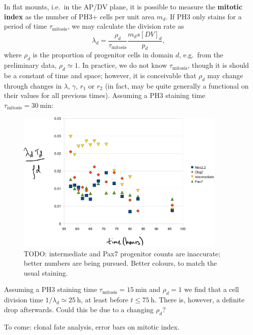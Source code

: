 \documentclass[10pt,english]{article}
\begin{document}
In flat mounts, i.e.\ in the AP/DV plane, it is possible to measure the \textbf{mitotic index} as the number of PH3+ cells per unit area $m_d$. If PH3 only stains for a period of time $\tau_\textrm{mitosis}$, we may calculate the division rate as $$\lambda_d = \frac{\rho_d}{\tau_\textrm{mitosis}}\frac{m_d s [DV]_d}{p_d},$$ where $\rho_d$ is the proportion of progenitor cells in domain $d$, e.g.\ from the preliminary data, $\rho_d \simeq 1$. In practice, we do not know $\tau_\textrm{mitosis}$, though it is should be a constant of time and space; however, it is conceivable that $\rho_d$ may change through changes in $\lambda$, $\gamma$, $r_1$ or $r_2$ (in fact, may be quite generally a functional on their values for all previous times). Assuming a PH3 staining time $\tau_\textrm{mitosis} = \SI{30}{\minute}$:

\begin{figure}[h]
	\begin{center}
		\includegraphics[width=4in]{consistency-mitotic-index.png}
	\end{center}
	\caption{TODO: intermediate and Pax7 progenitor counts are inaccurate; better numbers are being pursued. Better colours, to match the usual staining.}
\end{figure}


Assuming a PH3 staining time $\tau_\textrm{mitosis} = \SI{15}{\minute}$ and $\rho_d = 1$ we find that a cell division time $1/\lambda_d \simeq \SI{25}{\hour}$, at least before $t \le \SI{75}{\hour}$. There is, however, a definite drop afterwards. Could this be due to a changing $\rho_d$?

To come: clonal fate analysis, error bars on mitotic index.
\end{document}
